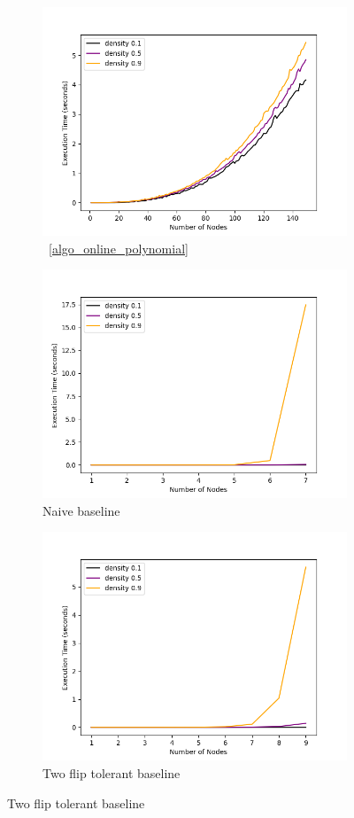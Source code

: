 \documentclass[sigplan,review,anonymous]{acmart}
\begin{document}
{\begin{figure}
    \begin{subfigure}{0.5\linewidth}
      \includegraphics[width=.8\linewidth]{timeVsSize_10_Polynomial.png}
      \caption{~\ref{algo_online_polynomial}}
      \label{fig:sfigPolynomialTvsS}
    \end{subfigure}
    
    \begin{subfigure}{0.5\linewidth}
      \includegraphics[width=.8\linewidth]{timeVsSize_10_NaiveChecker.png}
      \caption{Naive baseline}
      \label{fig:sfigNa\"{i}veTvsS}
    \end{subfigure}

    \begin{subfigure}{0.5\linewidth}
      \includegraphics[width=.8\linewidth]{timeVsSize_10_TwoFlipPathChecker.png}
      \caption{Two flip tolerant baseline}
      \label{fig:sfigTwoFlipTvsS}
    \end{subfigure}


\end{figure}}
\end{document}

